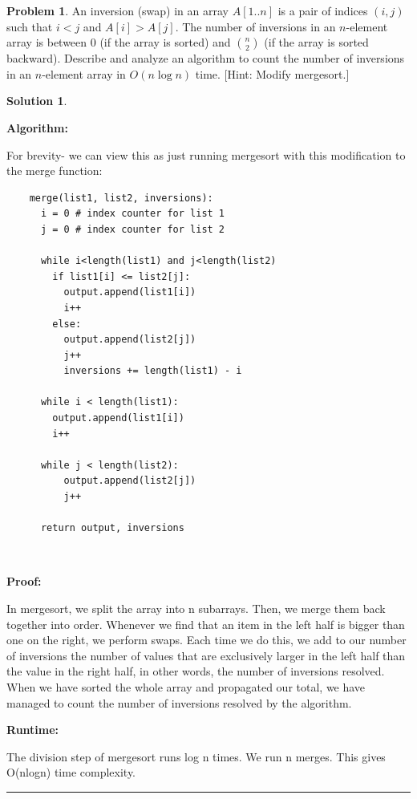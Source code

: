 \documentclass{article}
\theoremstyle{definition}
\newtheorem{problem}{Problem}
\def\fline{\rule{0.75\linewidth}{0.5pt}}
\newcommand{\finishline}{
  \begin{center}\fline
\end{center}}
\newtheorem*{solution*}{Solution}
\newenvironment{solution}{
\begin{solution*}}{{\finishline}
\end{solution*}}
\begin{document}
\newpage

\begin{problem}
  An inversion (swap) in an array $A[1 . . n]$ is a pair of indices $(i, j)$ such that $i<j$ and $A[i]>A[j]$. The number of inversions in an $n$-element array is between 0 (if the array is sorted) and $\binom{n}{2}$ (if the array is sorted backward). Describe and analyze an algorithm to count the number of inversions in an $n$-element array in $O(n \log n)$ time. [Hint: Modify mergesort.]
\end{problem}

\begin{solution}
  \

  \textbf{Algorithm:}
  \

  For brevity- we can view this as just running mergesort with this modification to the merge function:

  \begin{verbatim}
    merge(list1, list2, inversions):
      i = 0 # index counter for list 1
      j = 0 # index counter for list 2

      while i<length(list1) and j<length(list2)
        if list1[i] <= list2[j]:
          output.append(list1[i])
          i++
        else:
          output.append(list2[j])
          j++
          inversions += length(list1) - i

      while i < length(list1):
        output.append(list1[i])
        i++

      while j < length(list2):
          output.append(list2[j])
          j++

      return output, inversions

  \end{verbatim}
  \

  \textbf{Proof:}
  \

  In mergesort, we split the array into n subarrays. Then, we merge them back together into order. Whenever we find that an item in the left half is bigger than one on the right, we perform swaps. Each time we do this, we add to our number of inversions the number of values that are exclusively larger in the left half than the value in the right half, in other words, the number of inversions resolved.
  When we have sorted the whole array and propagated our total, we have managed to count the number of inversions resolved by the algorithm.
  \

  \textbf{Runtime:}
  \

  The division step of mergesort runs log n times. We run n merges. This gives O(nlogn) time complexity.
\end{solution}
\end{document}
